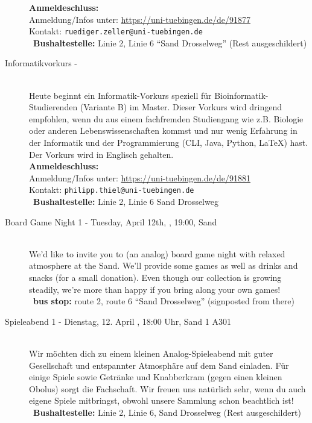 \begin{description}
	\textbf{Anmeldeschluss:} \matheanmeldung\YEAR\\
	Anmeldung/Infos unter:  \url{https://uni-tuebingen.de/de/91877}\\
	Kontakt: \texttt{ruediger.zeller@uni-tuebingen.de}\\
	\ifsommersemester
	~\textbf{Bushaltestelle:} Linie 2, Linie 6 "`Sand Drosselweg"' (Rest ausgeschildert)
	\fi
\fi

\ifmaster
    \ifbinfo
        \item[Informatikvorkurs - \bioinfoDatum~\YEAR]\ \\
            Heute beginnt ein Informatik-Vorkurs speziell für Bioinformatik-Studierenden (Variante B) im Master. Dieser Vorkurs wird dringend empfohlen, wenn du aus einem fachfremden Studiengang wie z.B. Biologie oder anderen Lebenswissenschaften kommst und nur wenig Erfahrung in der Informatik und der Programmierung (CLI, Java, Python, \LaTeX) hast. Der Vorkurs wird in Englisch gehalten. \\
            \textbf{Anmeldeschluss:} \bioinfoAnmeldung\YEAR\\
            Anmeldung/Infos unter: \url{https://uni-tuebingen.de/de/91881}\\
            Kontakt: \texttt{philipp.thiel@uni-tuebingen.de}\\
        ~\textbf{Bushaltestelle:} Linie 2, Linie 6 Sand Drosselweg
    \fi
\fi


\ifml
	\item[Board Game Night 1 - Tuesday, April 12th, \YEAR, 19:00, Sand]~\\
	We'd like to invite you to (an analog) board game night with relaxed atmosphere at the Sand.
    We'll provide some games as well as drinks and snacks (for a small donation).
    Even though our collection is growing steadily, we're more than happy if you bring along your own games!\\
	~\textbf{bus stop:} route 2, route 6 "`Sand Drosselweg"' (signposted from there)
\else
    \item[Spieleabend 1 - Dienstag, 12. April \YEAR, 18:00 Uhr, Sand 1 A301]~\\
	Wir möchten dich zu einem kleinen Analog-Spieleabend mit guter Gesellschaft und entspannter Atmosphäre auf dem Sand einladen.
    Für einige Spiele sowie Getränke und Knabberkram (gegen einen kleinen Obolus) sorgt die Fachschaft.
    Wir freuen uns natürlich sehr, wenn du auch eigene Spiele mitbringst, obwohl unsere Sammlung schon beachtlich ist!\\
	~\textbf{Bushaltestelle:} Linie 2, Linie 6, Sand Drosselweg (Rest ausgeschildert)
\fi


\end{description}
